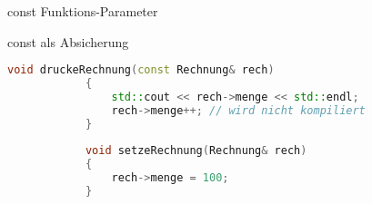 \begin{frame}[fragile]{const Funktions-Parameter}

	\begin{block}{const als Absicherung}
		\begin{lstlisting}[language=C++]
			void druckeRechnung(const Rechnung& rech)
			{
			    std::cout << rech->menge << std::endl;
			    rech->menge++; // wird nicht kompiliert
			}
	
			void setzeRechnung(Rechnung& rech)
			{
			    rech->menge = 100;
			}
		\end{lstlisting}
	\end{block}


\end{frame}

